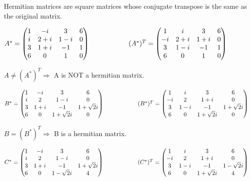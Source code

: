 \documentclass[fleqn]{article}
\begin{document}
\begin{enumerate}
      \textcolor{hwColor}{Hermitian matrices are square matrices whose conjugate transpose is the same as the original matrix.}

      \textcolor{hwColor}{
        $
        A^*=\begin{pmatrix}
          1 & -i & 3 & 6 \\
          i & 2+i & 1-i & 0 \\
          3 & 1+i & -1 & 1 \\
          6 & 0 & 1 & 0
        \end{pmatrix}
        \hskip 2truecm
        (A^*)^T=\begin{pmatrix}
          1 & i & 3 & 6 \\
          -i & 2+i & 1+i  & 0 \\
          3 & 1-i & -1 & 1 \\
          6 & 0 & 1 & 0 \\
        \end{pmatrix}
        $ 
      }

      \textcolor{hwColor}{$A \ne (A^*)^T\Longrightarrow$ A is NOT a hermitian matrix.}

      \bigbreak

      \textcolor{hwColor}{
        $
        B^*=\begin{pmatrix}
          1 & -i & 3 & 6 \\
          i & 2 & 1-i  & 0 \\
          3 & 1+i & -1 & 1+\sqrt{2}i \\
          6 & 0 & 1+\sqrt{2}i & 0 \\
        \end{pmatrix}
        \hskip 2truecm
        (B^*)^T=\begin{pmatrix}
          1 & i & 3 & 6 \\
          -i & 2 & 1+i & 0 \\
          3 & 1-i & -1 & 1+\sqrt{2}i \\
          6 & 0 & 1+\sqrt{2}i & 0
        \end{pmatrix}
        $
      }

      \textcolor{hwColor}{$B=(B^*)^T\Longrightarrow$ B is a hermitian matrix.}

      \bigbreak

      \textcolor{hwColor}{
        $
        C^*=\begin{pmatrix}
          1 & -i & 3 & 6 \\
          i & 2 & 1-i & 0 \\
          3 & 1+i & -1 & 1+\sqrt{2}i \\
          6 & 0 & 1-\sqrt{2}i & 4 \\
        \end{pmatrix}
        \hskip 2truecm
        (C^*)^T=\begin{pmatrix}
          1 & i & 3 & 6 \\
          -i & 2 & 1+i & 0 \\
          3 & 1-i & -1 & 1-\sqrt{2}i \\
          6 & 0 & 1+\sqrt{2}i & 4
        \end{pmatrix}
        $
      }


\end{enumerate}
\end{document}
